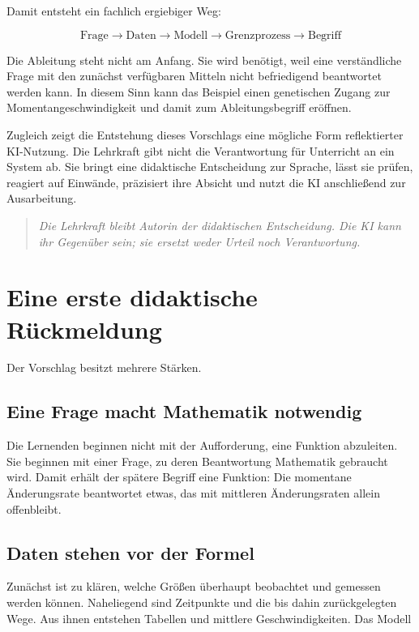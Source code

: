 \documentclass[11pt,a4paper]{article}
\newenvironment{leitgedanke}
  {\begin{quote}\color{dunkelblau}\itshape}
  {\end{quote}}
\begin{document}
Damit entsteht ein fachlich ergiebiger Weg:

\[
\boxed{\text{Frage}}
\longrightarrow
\boxed{\text{Daten}}
\longrightarrow
\boxed{\text{Modell}}
\longrightarrow
\boxed{\text{Grenzprozess}}
\longrightarrow
\boxed{\text{Begriff}}
\]

Die Ableitung steht nicht am Anfang. Sie wird benötigt, weil eine verständliche
Frage mit den zunächst verfügbaren Mitteln nicht befriedigend beantwortet werden
kann. In diesem Sinn kann das Beispiel einen genetischen Zugang zur
Momentangeschwindigkeit und damit zum Ableitungsbegriff eröffnen.

Zugleich zeigt die Entstehung dieses Vorschlags eine mögliche Form reflektierter
KI-Nutzung. Die Lehrkraft gibt nicht die Verantwortung für Unterricht an ein
System ab. Sie bringt eine didaktische Entscheidung zur Sprache, lässt sie
prüfen, reagiert auf Einwände, präzisiert ihre Absicht und nutzt die KI
anschließend zur Ausarbeitung.

\begin{leitgedanke}
Die Lehrkraft bleibt Autorin der didaktischen Entscheidung. Die KI kann ihr
Gegenüber sein; sie ersetzt weder Urteil noch Verantwortung.
\end{leitgedanke}


\section{Eine erste didaktische Rückmeldung}

Der Vorschlag besitzt mehrere Stärken.

\subsection{Eine Frage macht Mathematik notwendig}

Die Lernenden beginnen nicht mit der Aufforderung, eine Funktion abzuleiten.
Sie beginnen mit einer Frage, zu deren Beantwortung Mathematik gebraucht wird.
Damit erhält der spätere Begriff eine Funktion: Die momentane Änderungsrate
beantwortet etwas, das mit mittleren Änderungsraten allein offenbleibt.

\subsection{Daten stehen vor der Formel}

Zunächst ist zu klären, welche Größen überhaupt beobachtet und gemessen werden
können. Naheliegend sind Zeitpunkte und die bis dahin zurückgelegten Wege. Aus
ihnen entstehen Tabellen und mittlere Geschwindigkeiten. Das Modell
\end{document}
